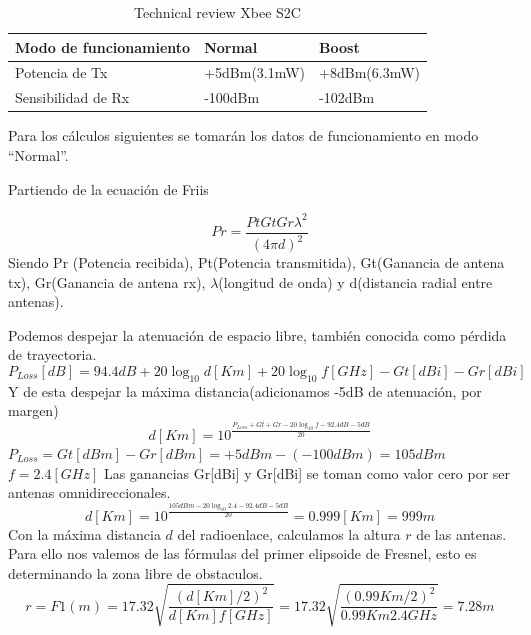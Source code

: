 \documentclass[11pt,oneside,spanish,a4paper]{article}
\begin{document}
\begin{table}[h]
	\centering
	\begin{tabular}{l l l}
		\hline
		\textbf{Modo de funcionamiento} & \textbf{Normal} & \textbf{Boost}\\
		\hline
		Potencia de Tx & +5dBm(3.1mW) & +8dBm(6.3mW) \\
		Sensibilidad de Rx & -100dBm & -102dBm\\
		\hline
	\end{tabular}
	\caption{Technical review Xbee S2C}
\end{table}
Para los c\'alculos siguientes se tomar\'an los datos de funcionamiento en modo ``Normal''.

Partiendo de la ecuaci\'on de Friis\cite{bilb:Friis}




\begin{equation*}
\label{Ec:Friis}
Pr = \frac{Pt Gt Gr \lambda ^{2}}{(4\pi d)^2}
\end{equation*}
Siendo Pr (Potencia recibida), Pt(Potencia transmitida), Gt(Ganancia de antena tx), Gr(Ganancia de antena rx), $\lambda$(longitud de onda) y d(distancia radial entre antenas).

Podemos despejar la atenuaci\'on de espacio libre, tambi\'en conocida como p\'erdida de trayectoria\cite{bilb:Free}.
\begin{equation*}
\label{Ec:perdida}
P_{Loss}[dB] = 94.4 dB + 20 \log_{10}d [Km] + 20 \log_{10}f [GHz] - Gt[dBi] - Gr[dBi]
\end{equation*}
Y de esta despejar la m\'axima distancia(adicionamos -5dB de atenuaci\'on, por margen)
\begin{equation*}
\label{Ec:distancia}
d[Km] = 10^{\frac{P_{Loss} + Gt + Gr - 20 \log_{10}f - 92.4dB -5dB}{20}}
\end{equation*}
$P_{Loss}=Gt[dBm] - Gr[dBm] = +5dBm - (-100dBm) = 105dBm$
$f = 2.4 [GHz]$
Las ganancias Gr[dBi] y Gr[dBi] se toman como valor cero por ser antenas omnidireccionales.
\begin{equation*}
\label{Ec:distancia1}
d[Km] = 10^{\frac{105 dBm - 20 \log_{10}2.4 - 92.4dB-5dB}{20}} = 0.999 [Km] =999m
\end{equation*}	
Con la m\'axima distancia $d$ del radioenlace, calculamos la altura $r$ de las antenas. Para ello nos valemos de las f\'ormulas del primer elipsoide de Fresnel, esto es determinando la zona libre de obstaculos\cite{bilb:Fresnel}.
\begin{equation*}
\label{Ec:fresnel}
r = F1(m) = 17.32 \sqrt{\frac{(d[Km]/2)^2}{d[Km]f[GHz]}} = 17.32 \sqrt{\frac{(0.99Km/2)^2}{0.99Km2.4GHz}} = 7.28m
\end{equation*}	
\end{document}

